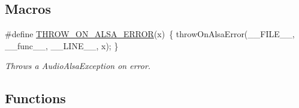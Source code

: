 \subsection*{Macros}
\begin{DoxyCompactItemize}
\item 
\#define \hyperlink{group__Audio_gafae72c2f69f7029e3174ba2d9350adae}{T\-H\-R\-O\-W\-\_\-\-O\-N\-\_\-\-A\-L\-S\-A\-\_\-\-E\-R\-R\-O\-R}(x)~\{ throw\-On\-Alsa\-Error(\-\_\-\-\_\-\-F\-I\-L\-E\-\_\-\-\_\-, \-\_\-\-\_\-func\-\_\-\-\_\-, \-\_\-\-\_\-\-L\-I\-N\-E\-\_\-\-\_\-, x); \}
\begin{DoxyCompactList}\small\item\em Throws a Audio\-Alsa\-Exception on error. \end{DoxyCompactList}\end{DoxyCompactItemize}
\subsection*{Functions}

